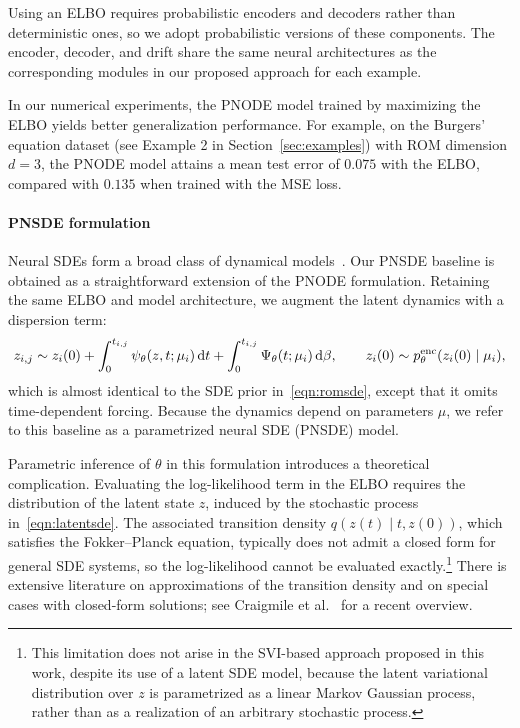 \documentclass{article}
\begin{document}
	
	Using an ELBO requires probabilistic encoders and decoders rather than deterministic ones, so we adopt probabilistic versions of these components. The encoder, decoder, and drift share the same neural architectures as the corresponding modules in our proposed approach for each example.
	
	In our numerical experiments, the PNODE model trained by maximizing the ELBO yields better generalization performance. For example, on the Burgers' equation dataset (see Example 2 in Section~\ref{sec:examples}) with ROM dimension $d=3$, the PNODE model attains a mean test error of $0.075$ with the ELBO, compared with $0.135$ when trained with the MSE loss.
	
	
	\paragraph{PNSDE formulation}
	Neural SDEs form a broad class of dynamical models~\cite{Oh_2024_Stable_NSDEs}. Our PNSDE baseline is obtained as a straightforward extension of the PNODE formulation. Retaining the same ELBO and model architecture, we augment the latent dynamics with a dispersion term:
	\begin{equation} \label{eqn:latentsde}
		z_{i,j} \sim z_i(0) + \int_0^{t_{i,j}}\psi_\theta(z, t; \mu_i)\,{\rm d}t 
		+ \int_0^{t_{i,j}}\Psi_\theta(t; \mu_i)\,{\rm d}\beta,
		\qquad 
		z_i(0) \sim p_\theta^{\rm enc}(z_i(0)\mid \mu_i),
	\end{equation}
	which is almost identical to the SDE prior in~\eqref{eqn:romsde}, except that it omits time-dependent forcing. Because the dynamics depend on parameters $\mu$, we refer to this baseline as a parametrized neural SDE (PNSDE) model.
	
	
	
	Parametric inference of $\theta$ in this formulation introduces a theoretical complication. Evaluating the log-likelihood term in the ELBO requires the distribution of the latent state $z$, induced by the stochastic process in~\eqref{eqn:latentsde}. The associated transition density $q(z(t)\mid t, z(0))$, which satisfies the Fokker–Planck equation, typically does not admit a closed form for general SDE systems, so the log-likelihood cannot be evaluated exactly.\footnote{This limitation does not arise in the SVI-based approach proposed in this work, despite its use of a latent SDE model, because the latent variational distribution over $z$ is parametrized as a linear Markov Gaussian process, rather than as a realization of an arbitrary stochastic process.} There is extensive literature on approximations of the transition density and on special cases with closed-form solutions; see Craigmile et al.~\cite{Craigmile_2023_Inference_SDEs_Review} for a recent overview.
	
\end{document}

